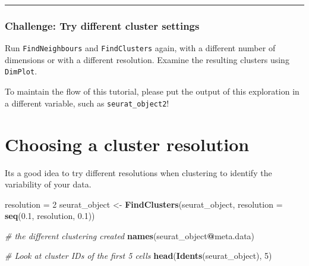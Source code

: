 \documentclass[
]{book}
\newenvironment{Shaded}{\begin{snugshade}}{\end{snugshade}}
\newcommand{\AttributeTok}[1]{\textcolor[rgb]{0.13,0.29,0.53}{#1}}
\newcommand{\CommentTok}[1]{\textcolor[rgb]{0.56,0.35,0.01}{\textit{#1}}}
\newcommand{\DecValTok}[1]{\textcolor[rgb]{0.00,0.00,0.81}{#1}}
\newcommand{\FloatTok}[1]{\textcolor[rgb]{0.00,0.00,0.81}{#1}}
\newcommand{\FunctionTok}[1]{\textcolor[rgb]{0.13,0.29,0.53}{\textbf{#1}}}
\newcommand{\NormalTok}[1]{#1}
\newcommand{\OtherTok}[1]{\textcolor[rgb]{0.56,0.35,0.01}{#1}}
\newcommand{\SpecialCharTok}[1]{\textcolor[rgb]{0.81,0.36,0.00}{\textbf{#1}}}
\begin{document}
\begin{center}\rule{0.5\linewidth}{0.5pt}\end{center}

\subsubsection*{Challenge: Try different cluster settings}\label{challenge-try-different-cluster-settings}

Run \texttt{FindNeighbours} and \texttt{FindClusters} again, with a different number of dimensions or with a different resolution. Examine the resulting clusters using \texttt{DimPlot}.

To maintain the flow of this tutorial, please put the output of this exploration in a different variable, such as \texttt{seurat\_object2}!

\subsubsection*{}\label{section-11}

\section{Choosing a cluster resolution}\label{choosing-a-cluster-resolution}

Its a good idea to try different resolutions when clustering to identify the variability of your data.

\begin{Shaded}
\begin{Highlighting}[]
\NormalTok{resolution }\OtherTok{=} \DecValTok{2}
\NormalTok{seurat\_object }\OtherTok{\textless{}{-}} \FunctionTok{FindClusters}\NormalTok{(seurat\_object, }\AttributeTok{resolution =} \FunctionTok{seq}\NormalTok{(}\FloatTok{0.1}\NormalTok{, resolution, }\FloatTok{0.1}\NormalTok{))}

\CommentTok{\# the different clustering created}
\FunctionTok{names}\NormalTok{(seurat\_object}\SpecialCharTok{@}\NormalTok{meta.data)}

\CommentTok{\# Look at cluster IDs of the first 5 cells}
\FunctionTok{head}\NormalTok{(}\FunctionTok{Idents}\NormalTok{(seurat\_object), }\DecValTok{5}\NormalTok{)}
\end{Highlighting}
\end{Shaded}
\end{document}

